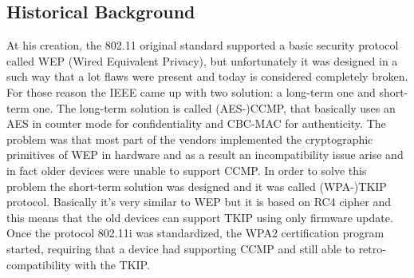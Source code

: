 \subsection{Historical Background}

At his creation, the 802.11 original standard supported a basic security protocol called WEP (Wired Equivalent Privacy), but unfortunately it was designed in a such way that a lot flaws
were present and today is considered completely broken. For those reason the IEEE came up with two solution: a long-term one and short-term one. 
The long-term solution is called (AES-)CCMP, that basically uses an AES in counter mode for confidentiality and CBC-MAC for authenticity. The problem was that most part of the vendors
implemented the cryptographic primitives of WEP in hardware and as a result an incompatibility issue arise and in fact older devices were unable to support CCMP.
In order to solve this problem the short-term solution was designed and it was called (WPA-)TKIP protocol. Basically it's very similar to WEP but it is based on RC4 cipher and this means that
the old devices can support TKIP using only firmware update.
Once the protocol 802.11i was standardized, the WPA2 certification program started, requiring that a device had supporting CCMP and still able to retro-compatibility with the TKIP.

